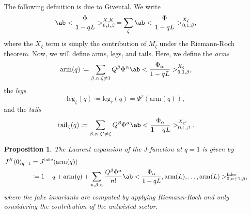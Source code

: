 \documentclass{amsart}
\newtheorem{prop}[thm]{Proposition}
\theoremstyle{definition}
\theoremstyle{remark}
\theoremstyle{plain}
\theoremstyle{definition}
\theoremstyle{remark}
\newcommand{\mr}[1]{\mathrm{#1}}
\newcommand{\1}{\mathbf{1}}
\newcommand{\2}{\mathbf{2}}
\newcommand{\3}{\mathbf{3}}
\begin{document}
%
%

The following definition is due to Givental. We write
\[ \ab<\frac{\Phi}{1-qL}>_{0,1,\beta}^{X,K} \coloneqq \sum_{\zeta} \ab<\frac{\Phi}{1-qL}>_{0,1,\beta}^{X_{\zeta}}, \]
where the \(X_{\zeta}\) term is simply the contribution of \(M_{\zeta}\) under the Riemann-Roch theorem. Now, we will define arms, legs, and tails. Here, we define the \textit{arms}
\[ \mr{arm}(q) \coloneqq \sum_{\beta, \alpha, \zeta \neq 1} Q^{\beta} \Phi^{\alpha}\ab<\frac{\Phi_{\alpha}}{1-qL}>_{0,1,\beta}^{X_{\zeta}}, \]
the \textit{legs}
\[ \mr{leg}_{\zeta}(q) \coloneqq \mr{leg}_r(q) = \Psi^r (\mr{arm}(q)), \]
and the \textit{tails}
\[ \mr{tail}_{\zeta}(q) \coloneqq \sum_{\beta, \alpha, \zeta' \neq \zeta} Q^{\beta} \Phi^{\alpha} \ab<\frac{\Phi_{\alpha}}{1-qL}>_{0,1,\beta}^{X_{\zeta'}}. \]

\begin{prop}
    The Laurent expansion of the J-function at \(q = 1\) is given by
    \begin{align*}
        J^K(0)_{q=1} &= J^{\mr{fake}}(\mr{arm}(q)) \\
        &\coloneqq 1-q + \mr{arm}(q) + \sum_{n,\beta,\alpha} \frac{Q^{\beta}\Phi^{\alpha}}{n!} \ab<\frac{\Phi_{\alpha}}{1-qL}, \mr{arm}(L), \ldots, \mr{arm}(L)>_{0,n+1,\beta}^{\mr{fake}},
    \end{align*}
    where the fake invariants are computed by applying Riemann-Roch and only considering the contribution of the untwisted sector.
\end{prop}
\end{document}
